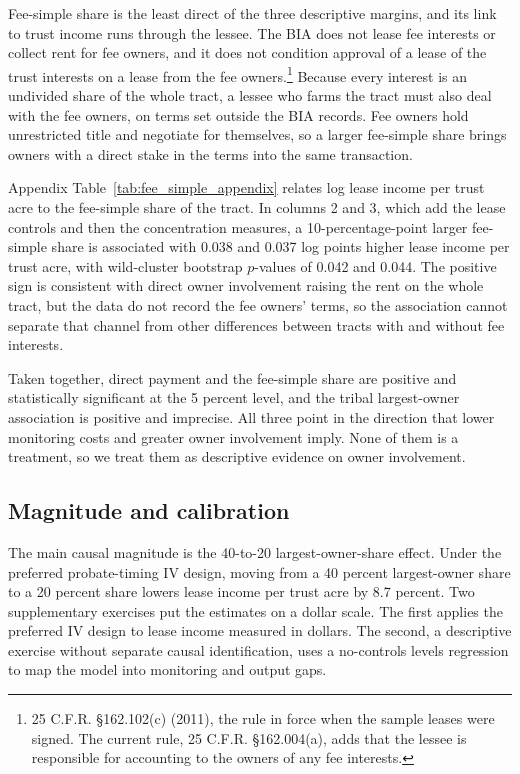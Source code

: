 \documentclass[12pt]{article}
\begin{document}
Fee-simple share is the least direct of the three descriptive margins, and its link to trust income runs through the lessee. The BIA does not lease fee interests or collect rent for fee owners, and it does not condition approval of a lease of the trust interests on a lease from the fee owners.\footnote{25 C.F.R. \S 162.102(c) (2011), the rule in force when the sample leases were signed. The current rule, 25 C.F.R. \S 162.004(a), adds that the lessee is responsible for accounting to the owners of any fee interests.} Because every interest is an undivided share of the whole tract, a lessee who farms the tract must also deal with the fee owners, on terms set outside the BIA records. Fee owners hold unrestricted title and negotiate for themselves, so a larger fee-simple share brings owners with a direct stake in the terms into the same transaction.

Appendix Table~\ref{tab:fee_simple_appendix} relates log lease income per trust acre to the fee-simple share of the tract. In columns 2 and 3, which add the lease controls and then the concentration measures, a 10-percentage-point larger fee-simple share is associated with 0.038 and 0.037 log points higher lease income per trust acre, with wild-cluster bootstrap $p$-values of 0.042 and 0.044. The positive sign is consistent with direct owner involvement raising the rent on the whole tract, but the data do not record the fee owners' terms, so the association cannot separate that channel from other differences between tracts with and without fee interests.

Taken together, direct payment and the fee-simple share are positive and statistically significant at the 5 percent level, and the tribal largest-owner association is positive and imprecise. All three point in the direction that lower monitoring costs and greater owner involvement imply. None of them is a treatment, so we treat them as descriptive evidence on owner involvement.

\subsection{Magnitude and calibration} \label{Counterfactual}

The main causal magnitude is the 40-to-20 largest-owner-share effect. Under the preferred probate-timing IV design, moving from a 40 percent largest-owner share to a 20 percent share lowers lease income per trust acre by 8.7 percent. Two supplementary exercises put the estimates on a dollar scale. The first applies the preferred IV design to lease income measured in dollars. The second, a descriptive exercise without separate causal identification, uses a no-controls levels regression to map the model into monitoring and output gaps.
\end{document}
